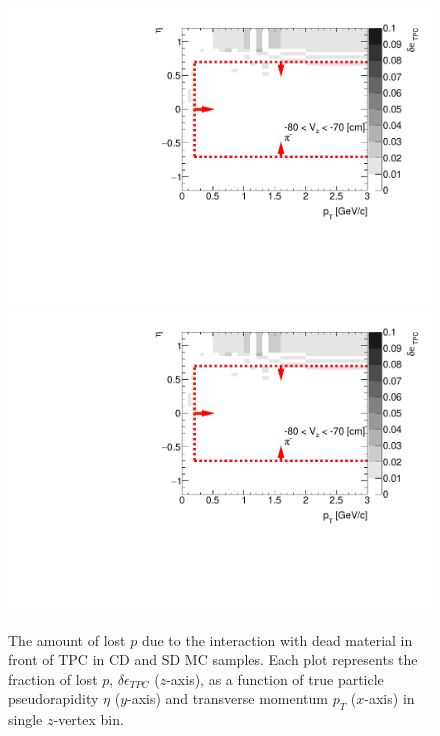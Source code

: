 \begin{figure}[H]
	\caption[The amount of lost $p$ due to the interaction with dead material in front of TPC as a function of $p_T$, $\eta$ and $z$-vertex in CD and SD]{The amount of lost $p$ due to the interaction with dead material in front of TPC in CD and SD MC samples. Each plot represents the fraction of lost $p$, $\delta\epsilon_{ TPC}$ ($z$-axis), as a function of true particle pseudorapidity $\eta$ ($y$-axis) and transverse momentum $p_{T}$ ($x$-axis) in single $z$-vertex bin.}\label{fig:dead_materialCDSD3Dp}
	\parbox{0.325\textwidth}{
		\includegraphics[width=\linewidth,page=81]{graphics/systematicsEfficiency/deadMaterial/secondaries_Unbinned_SDCD_.pdf}\\
		\includegraphics[width=\linewidth,page=84]{graphics/systematicsEfficiency/deadMaterial/secondaries_Unbinned_SDCD_.pdf}\\
}
\end{figure}
